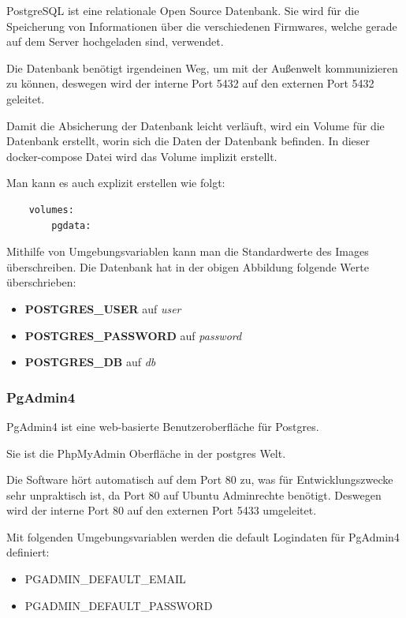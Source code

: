 PostgreSQL ist eine relationale Open Source Datenbank. Sie wird für die Speicherung von Informationen über die verschiedenen Firmwares, welche gerade auf dem Server hochgeladen sind, verwendet.

Die Datenbank benötigt irgendeinen Weg, um mit der Außenwelt kommunizieren zu können, deswegen wird der interne Port 5432 auf den externen Port 5432 geleitet.

Damit die Absicherung der Datenbank leicht verläuft, wird ein Volume für die Datenbank erstellt, worin sich die Daten der Datenbank befinden. In dieser docker-compose Datei wird das Volume implizit erstellt. 

Man kann es auch explizit erstellen wie folgt:

\begin{verbatim}
    volumes:
        pgdata:
\end{verbatim}

Mithilfe von Umgebungsvariablen kann man die Standardwerte des Images überschreiben. Die Datenbank hat in der obigen Abbildung folgende Werte überschrieben:

\begin{itemize}
    \item \textbf{POSTGRES\_USER} auf \textit{user}
    \item \textbf{POSTGRES\_PASSWORD} auf \textit{password}
    \item \textbf{POSTGRES\_DB} auf \textit{db}
\end{itemize}

\subsubsection{PgAdmin4}

PgAdmin4 ist eine web-basierte Benutzeroberfläche für Postgres.

Sie ist die PhpMyAdmin Oberfläche in der postgres Welt.

Die Software hört automatisch auf dem Port 80 zu, was für Entwicklungszwecke sehr unpraktisch ist, da Port 80 auf Ubuntu Adminrechte benötigt. Deswegen wird der interne Port 80 auf den externen Port 5433 umgeleitet.

Mit folgenden Umgebungsvariablen werden die default Logindaten für PgAdmin4 definiert:

\begin{itemize}
    \item PGADMIN\_DEFAULT\_EMAIL
    \item PGADMIN\_DEFAULT\_PASSWORD
\end{itemize}

